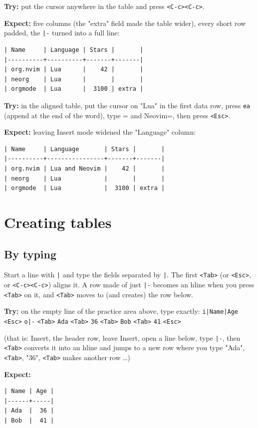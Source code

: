 \textbf{Try:} put the cursor anywhere in the table and press \texttt{<C-c><C-c>}.

\textbf{Expect:} five columns (the "extra" field made the table wider), every short
row padded, the \texttt{|-} turned into a full line:
\begin{verbatim}
| Name     | Language | Stars |       |
|----------+----------+-------+-------|
| org.nvim | Lua      |    42 |       |
| neorg    | Lua      |       |       |
| orgmode  | Lua      |  3100 | extra |
\end{verbatim}

\textbf{Try:} in the aligned table, put the cursor on "Lua" in the first data row,
press \texttt{ea} (append at the end of the word), type = and Neovim=, then press
\texttt{<Esc>}.

\textbf{Expect:} leaving Insert mode widened the "Language" column:
\begin{verbatim}
| Name     | Language       | Stars |       |
|----------+----------------+-------+-------|
| org.nvim | Lua and Neovim |    42 |       |
| neorg    | Lua            |       |       |
| orgmode  | Lua            |  3100 | extra |
\end{verbatim}
\section{Creating tables}
\label{sec:org3ec8003}
\subsection{By typing}
\label{sec:org897f433}
Start a line with \texttt{|} and type the fields separated by \texttt{|}. The first
\texttt{<Tab>} (or \texttt{<Esc>}, or \texttt{<C-c><C-c>}) aligns it. A row made of just \texttt{|-}
becomes an hline when you press \texttt{<Tab>} on it, and \texttt{<Tab>} moves to (and
creates) the row below.

\textbf{Try:} on the empty line of the practice area above, type exactly:
\texttt{i|Name|Age} \texttt{<Esc>} \texttt{o|-} \texttt{<Tab>} \texttt{Ada} \texttt{<Tab>} \texttt{36} \texttt{<Tab>} \texttt{Bob}
\texttt{<Tab>} \texttt{41} \texttt{<Esc>}

(that is: Insert, the header row, leave Insert, open a line below, type
\texttt{|-}, then \texttt{<Tab>} converts it into an hline and jumps to a new row where you
type "Ada", \texttt{<Tab>}, "36", \texttt{<Tab>} makes another row \ldots{})

\textbf{Expect:}
\begin{verbatim}
| Name | Age |
|------+-----|
| Ada  |  36 |
| Bob  |  41 |
\end{verbatim}

